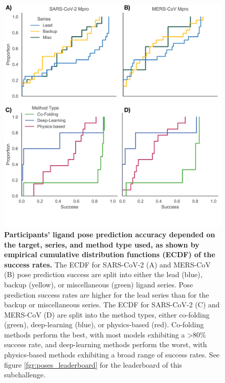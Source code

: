 \documentclass[journal=jcim,manuscript=article]{achemso}
\begin{document}
\begin{figure}
    \includegraphics[scale=1
    ]{fig7_poses_success_CDFs/Figure.png}
  \caption{\textbf{Participants' ligand pose prediction accuracy depended on the target, series, and method type used, as shown by empirical cumulative distribution functions (ECDF) of the success rates.} The ECDF for SARS-CoV-2 (A) and MERS-CoV (B) pose prediction success are  split into either the lead (blue), backup (yellow), or miscellaneous (green) ligand series. Pose prediction success rates are higher for the lead series than for the backup or miscellaneous series. The ECDF for SARS-CoV-2 (C) and MERS-CoV (D) are  split into the method types, either co-folding (green), deep-learning (blue), or physics-based (red). Co-folding methods perform the best, with most models exhibiting a \textgreater 80\% success rate, and deep-learning methods perform the worst, with physics-based methods exhibiting a broad range of success rates. See figure \ref{fgr:poses_leaderboard} for the leaderboard of this subchallenge.}
  \label{fgr:poses_by_series_and_method}
\end{figure}
\end{document}
